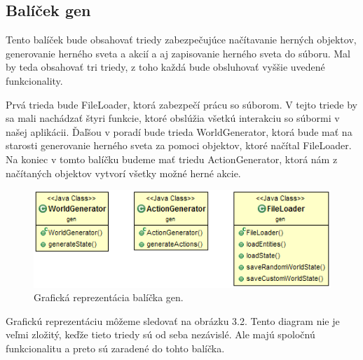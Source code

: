 \subsection{Balíček gen}
Tento balíček bude obsahovať triedy zabezpečujúce načítavanie herných objektov, generovanie herného sveta a akcií a aj zapisovanie herného sveta do súboru. Mal by teda obsahovať tri triedy, z toho každá bude obsluhovať vyššie uvedené funkcionality.\par
Prvá trieda bude FileLoader, ktorá zabezpečí prácu so súborom. V tejto triede by sa mali nachádzať štyri funkcie, ktoré obslúžia všetkú interakciu so súbormi v našej aplikácii. Ďaľšou v poradí bude trieda WorldGenerator, ktorá bude mať na starosti generovanie herného sveta za pomoci objektov, ktoré načítal FileLoader. Na koniec v tomto balíčku budeme mať triedu ActionGenerator, ktorá nám z načítaných objektov vytvorí všetky možné herné akcie.
\begin{figure}[H] 
\begin{center}
\includegraphics[scale=0.9]{img/gen.png}
\caption{Grafická reprezentácia balíčka gen.}
\label{fig:ch32}
\end{center}
\end{figure}
Grafickú reprezentáciu môžeme sledovať na obrázku 3.2. Tento diagram nie je veľmi zložitý, keďže tieto triedy sú od seba nezávislé. Ale majú spoločnú funkcionalitu a preto sú zaradené do tohto balíčka.
